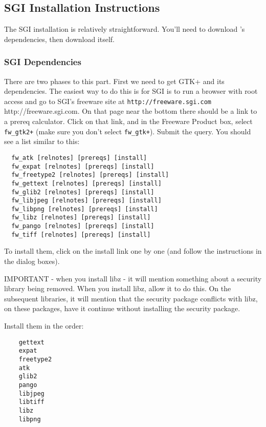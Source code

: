 \subsection{SGI Installation Instructions}
\label{sec:sgi-install}

The SGI installation is relatively straightforward.  You'll need to 
download \map{}'s dependencies, then download \map{} itself.

\subsubsection{SGI Dependencies}
There are two phases to this part.  First we need to get GTK+ and its
dependencies.  The easiest way to do this is for SGI is to run a browser
with root access and go to SGI's freeware site at \htmladdnormallink
{\texttt{http://freeware.sgi.com}} {http://freeware.sgi.com}.  On that page
near the bottom there should be a link to a prereq calculator.  Click on
that link, and in the Freeware Product box, select \verb|fw_gtk2+| (make
sure you don't select \verb|fw_gtk+|).  Submit the query.  You should see a
list similar to this:
\begin{verbatim}
  fw_atk [relnotes] [prereqs] [install] 
  fw_expat [relnotes] [prereqs] [install] 
  fw_freetype2 [relnotes] [prereqs] [install] 
  fw_gettext [relnotes] [prereqs] [install] 
  fw_glib2 [relnotes] [prereqs] [install] 
  fw_libjpeg [relnotes] [prereqs] [install]
  fw_libpng [relnotes] [prereqs] [install]
  fw_libz [relnotes] [prereqs] [install]
  fw_pango [relnotes] [prereqs] [install]
  fw_tiff [relnotes] [prereqs] [install] 
\end{verbatim}
To install them, click on the install link one by one (and follow the 
instructions in the dialog boxes). 

IMPORTANT - when you install libz - it will mention something about a security
library being removed.  When you install libz, allow it to do this.  On the 
subsequent libraries, it will mention that the security package conflicts 
with libz, on these packages, have it continue without installing the
security package.

Install them in the order:

\begin{verbatim}
    gettext
    expat
    freetype2
    atk
    glib2
    pango
    libjpeg
    libtiff
    libz
    libpng
\end{verbatim}

